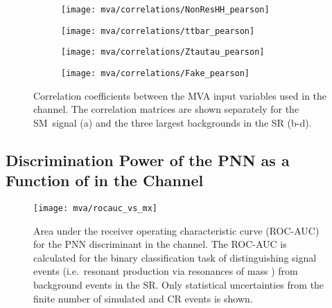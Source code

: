 \begin{figure}[htbp]
  \centering

  \begin{subfigure}[t]{.49\textwidth}
    \texttt{[image: mva/correlations/NonResHH\_pearson]}
  \end{subfigure}\hfill %
  \begin{subfigure}[t]{.49\textwidth}
    \texttt{[image: mva/correlations/ttbar\_pearson]}
  \end{subfigure}

  \begin{subfigure}[t]{.49\textwidth}
    \texttt{[image: mva/correlations/Ztautau\_pearson]}
  \end{subfigure}\hfill %
  \begin{subfigure}[t]{.49\textwidth}
    \texttt{[image: mva/correlations/Fake\_pearson]}
  \end{subfigure}

  \caption[Correlation coefficients between the MVA input variables used in the
  \hadhad channel]{Correlation coefficients between the MVA input variables
    used in the \hadhad channel. The correlation matrices are shown separately
    for the SM~\HH signal (a) and the three largest backgrounds in the \hadhad
    SR (b-d).}%
  \label{fig:mva_input_correlations}
\end{figure}


\clearpage
\subsection{Discrimination Power of the PNN as a Function of \mX in the \hadhad
  Channel}%
\label{app:pnn_rocauc_vs_mx}

\begin{figure}[htbp]
  \centering

  \texttt{[image: mva/rocauc\_vs\_mx]}

  \caption[ROC-AUC for the PNN discriminant as a function of \mX in the \hadhad
  channel]{Area under the receiver operating characteristic curve (ROC-AUC) for
    the PNN discriminant in the \hadhad channel. The ROC-AUC is calculated for
    the binary classification task of distinguishing signal events (i.e.\
    resonant \HH production via resonances of mass \mX) from background events
    in the \hadhad SR. Only statistical uncertainties from the finite number of
    simulated and CR events is shown.}%
  \label{fig:pnn_rocauc_vs_mx}
\end{figure}


